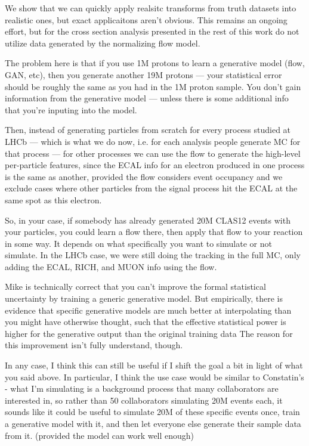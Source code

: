     
    \parencite{Radhakrishnan2020OverparameterizedMemory}

    We show that we can quickly apply realsitc transforms from truth datasets into realistic ones, but exact applicaitons aren't obvious. This remains an ongoing effort, but for the cross section analysis presented in the rest of this work do not utilize data generated by the normalizing flow model. 


    The problem here is that if you use 1M protons to learn a generative model (flow, GAN, etc), then you generate another 19M protons — your statistical error should be roughly the same as you had in the 1M proton sample. You don’t gain information from the generative model — unless there is some additional info that you’re inputing into the model.

    Then, instead of generating particles from scratch for every process studied at LHCb — which is what we do now, i.e. for each analysis people generate MC for that process — for other processes we can use the flow to generate the high-level per-particle features, since the ECAL info for an electron produced in one process is the same as another, provided the flow considers event occupancy and we exclude cases where other particles from the signal process hit the ECAL at the same spot as this electron.

    So, in your case, if somebody has already generated 20M CLAS12 events with your particles, you could learn a flow there, then apply that flow to your reaction in some way. It depends on what specifically you want to simulate or not simulate. In the LHCb case, we were still doing the tracking in the full MC, only adding the ECAL, RICH, and MUON info using the flow. 


    Mike is technically correct that you can't improve the formal statistical uncertainty by training a generic generative model.  But empirically, there is evidence that specific generative models are much better at interpolating than you might have otherwise thought, such that the effective statistical power is higher for the generative output than the original training data  The reason for this improvement isn't fully understand, though.


    In any case, I think this can still be useful if I shift the goal a bit in light of what you said above. In particular, I think the use case would be similar to Constatin's - what I'm simulating is a background process that many collaborators are interested in,  so rather than 50 collaborators simulating 20M events each, it sounds like it could be useful to simulate 20M of these specific events once, train a generative model with it, and then let everyone else generate their sample data from it. (provided the model can work well enough)
    
